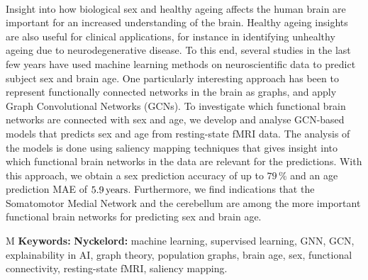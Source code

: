 \thesisImprintTitle\\
\thesisImprintSubtitle\\
\thesisAuthor\\
\thesisDepartment\\
\thesisUniversity\setlength{\parskip}{0.5cm}

\thispagestyle{plain}			%
\section*{\abstractname}

Insight into how biological sex and healthy ageing affects the human brain are important for an increased understanding of the brain. Healthy ageing insights are also useful for clinical applications, for instance in identifying unhealthy ageing due to neurodegenerative disease. To this end, several studies in the last few years have used machine learning methods on neuroscientific data to predict subject sex and brain age. One particularly interesting approach has been to represent functionally connected networks in the brain as graphs, and apply Graph Convolutional Networks (GCNs). To investigate which functional brain networks are connected with sex and age, we develop and analyse GCN-based models that predicts sex and age from resting-state fMRI data. The analysis of the models is done using saliency mapping techniques that gives insight into which functional brain networks in the data are relevant for the predictions. With this approach, we obtain a sex prediction accuracy of up to $79\,\%$ and an age prediction MAE of $5.9\rm\,years$. Furthermore, we find indications that the Somatomotor Medial Network and the cerebellum are among the more important functional brain networks for predicting sex and brain age.

\vfill
\if\thesisType M
    \textbf{Keywords:}
\else
    \textbf{Nyckelord:}
\fi
machine learning, supervised learning, GNN, GCN, explainability in AI, graph theory, population graphs, brain age, sex, functional connectivity, resting-state fMRI, saliency mapping.
\if{}
\newpage				%
\thispagestyle{empty}
\mbox{}
\fi
